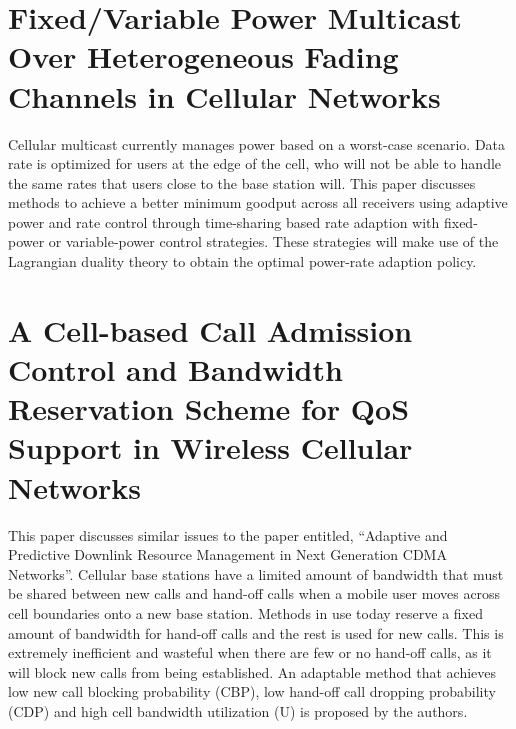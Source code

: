\documentclass[11pt]{article}
\begin{document}
\section{Fixed/Variable Power Multicast Over Heterogeneous Fading Channels in Cellular Networks}
\label{sec-7}


Cellular multicast currently manages power based on a worst-case
scenario. Data rate is optimized for users at the edge of the cell,
who will not be able to handle the same rates that users close to the
base station will. This paper discusses methods to achieve a better
minimum goodput across all receivers using adaptive power and rate
control through time-sharing based rate adaption with fixed-power or
variable-power control strategies. These strategies will make use of
the Lagrangian duality theory to obtain the optimal power-rate
adaption policy.


\section{A Cell-based Call Admission Control and Bandwidth Reservation Scheme for QoS Support in Wireless Cellular Networks}
\label{sec-8}


This paper discusses similar issues to the paper entitled, “Adaptive
and Predictive Downlink Resource Management in Next Generation CDMA
Networks”. Cellular base stations have a limited amount of bandwidth
that must be shared between new calls and hand-off calls when a mobile
user moves across cell boundaries onto a new base station. Methods in
use today reserve a fixed amount of bandwidth for hand-off calls and
the rest is used for new calls. This is extremely inefficient and
wasteful when there are few or no hand-off calls, as it will block new
calls from being established. An adaptable method that achieves low
new call blocking probability (CBP), low hand-off call dropping
probability (CDP) and high cell bandwidth utilization (U) is proposed
by the authors.
\end{document}
